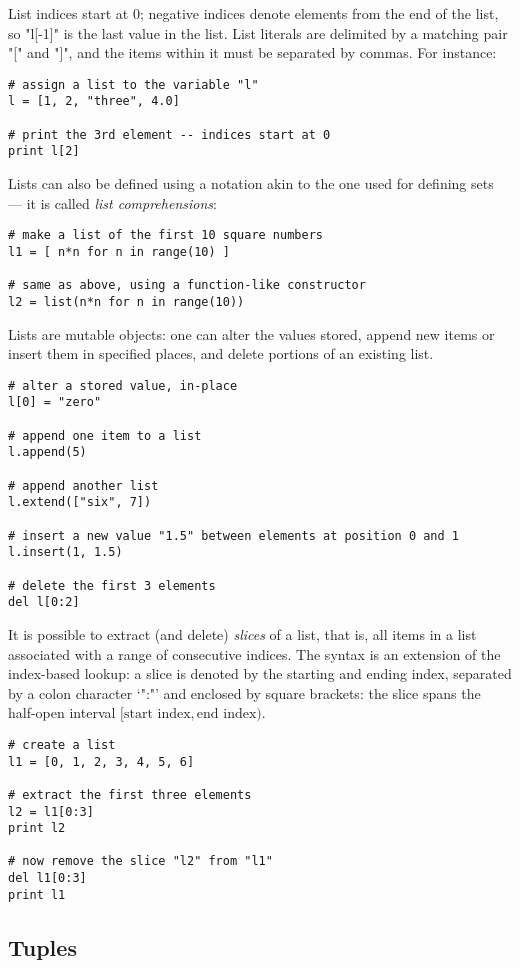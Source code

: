 {List indices start at 0; negative indices denote elements from the end
of the list, so "l[-1]" is the last value in the list.  List
literals are delimited by a matching pair "[" and "]", and the
items within it must be separated by commas. For instance:
\begin{lstlisting}
# assign a list to the variable "l"
l = [1, 2, "three", 4.0]

# print the 3rd element -- indices start at 0
print l[2]
\end{lstlisting}
Lists can also be defined using a notation akin to the one used for
defining sets --- it is called \emph{list comprehensions}:
\begin{lstlisting}
# make a list of the first 10 square numbers
l1 = [ n*n for n in range(10) ]

# same as above, using a function-like constructor
l2 = list(n*n for n in range(10))
\end{lstlisting}

Lists are mutable objects: one can alter the values stored, append new
items or insert them in specified places, and delete portions of an
existing list.
\begin{lstlisting}
# alter a stored value, in-place
l[0] = "zero"

# append one item to a list
l.append(5)

# append another list
l.extend(["six", 7])

# insert a new value "1.5" between elements at position 0 and 1
l.insert(1, 1.5)

# delete the first 3 elements
del l[0:2]
\end{lstlisting}
It is possible to extract (and delete) \emph{slices} of a list, that is,
all items in a list associated with a range of consecutive indices.
The syntax is an extension of the index-based lookup: a slice is
denoted by the starting and ending index, separated by a colon
character `":"' and enclosed by square brackets: the slice spans the
half-open interval $[\text{start index}, \text{end index})$.
\begin{lstlisting}
# create a list
l1 = [0, 1, 2, 3, 4, 5, 6]

# extract the first three elements
l2 = l1[0:3]
print l2

# now remove the slice "l2" from "l1"
del l1[0:3]
print l1
\end{lstlisting}


\subsection{Tuples}
\label{sec:tuples}

}
